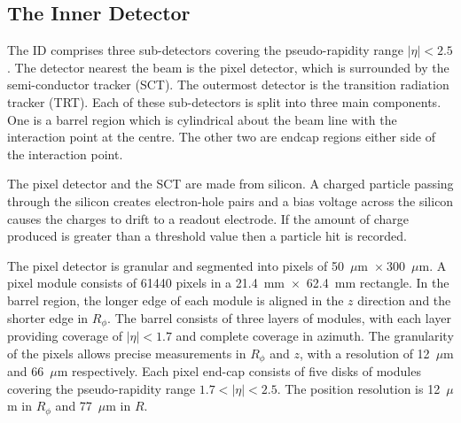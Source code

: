 \subsection{The Inner Detector}

The ID \cite{:1999fq:Chapter1,:1999fq:Chapter3} comprises three sub-detectors covering the pseudo-rapidity range $|\eta| < 2.5$. 
 The detector nearest the beam is the pixel detector, which is surrounded by the semi-conductor tracker (SCT). The outermost detector is the transition radiation tracker (TRT). Each of these sub-detectors is split into three main components. One is a barrel region which is cylindrical about the beam line with the interaction point at the centre. The other two are endcap regions either side of the interaction point.


The pixel detector and the SCT are made from silicon. A charged particle passing through the silicon creates electron-hole pairs and a bias voltage across the silicon causes the charges to drift to a readout electrode. If the amount of charge produced is greater than a threshold value then a particle hit is recorded.

The pixel detector is granular and segmented into pixels of 50~$\mu$m~$\times~$300~$\mu$m. A pixel module consists of 61440 pixels in a 21.4~mm~$\times$~62.4~mm rectangle. In the barrel region, the longer edge of each module is aligned in the $z$ direction and the shorter edge in $R_{\phi}$. The barrel consists of three layers of modules, with each layer providing coverage of $|\eta| < 1.7$ and complete coverage in azimuth. The granularity of the pixels allows precise measurements in $R_{\phi}$ and $z$, with a resolution of 12~$\mu$m and 66~$\mu$m respectively.
Each pixel end-cap consists of five disks of modules covering the pseudo-rapidity range $1.7<|\eta|<2.5$. The position resolution is 12~$\mu$m in $R_{\phi}$ and 77~$\mu$m in $R$.

